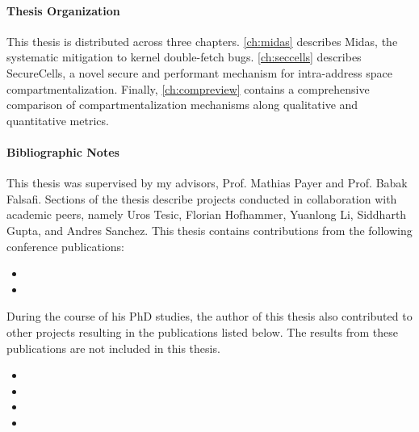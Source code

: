 \paragraph{Thesis Organization}
This thesis is distributed across three chapters. 
\autoref{ch:midas} describes Midas, the systematic mitigation to
kernel double-fetch bugs.
\autoref{ch:seccells} describes SecureCells, a novel secure and performant 
mechanism for intra-address space compartmentalization.
Finally, \autoref{ch:compreview} contains a comprehensive comparison of
compartmentalization mechanisms along qualitative and quantitative metrics.

\paragraph{Bibliographic Notes}
This thesis was supervised by my advisors, Prof. Mathias Payer and Prof. Babak Falsafi.
Sections of the thesis describe projects conducted in collaboration with academic peers, 
namely Uros Tesic, Florian Hofhammer, Yuanlong Li, Siddharth Gupta, and Andres Sanchez.
This thesis contains contributions from the following conference publications:
\begin{itemize}
      \item {}
      \item {}
\end{itemize}

During the course of his PhD studies, the author of this thesis also contributed to
other projects resulting in the publications listed below.
The results from these publications are not included in this thesis.
\begin{itemize}
      \item {}
      \item {}
      \item {}
      \item {}
\end{itemize}